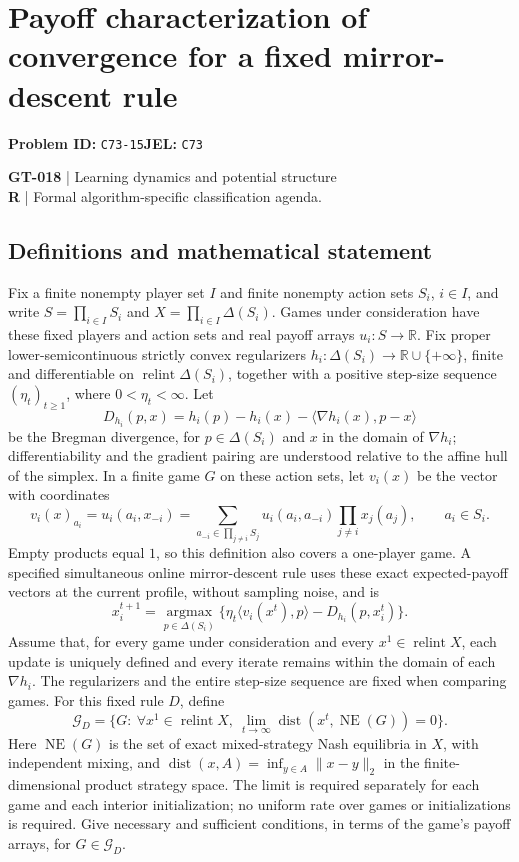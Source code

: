 \documentclass[11pt,a4paper]{article}
\newcommand{\R}{\mathbb R}
\begin{document}
\section*{Payoff characterization of convergence for a fixed mirror-descent rule}
\textbf{Problem ID:} \texttt{C73-15}\quad \textbf{JEL:} \texttt{C73}\par
\label{problem:OP-0148}
\label{game:GT-018}
{\sffamily\small\color{muted}
\textbf{GT-018} | Learning dynamics and potential structure\\
\textbf{R} | Formal algorithm-specific classification agenda.
\par}
\subsection*{Definitions and mathematical statement}
Fix a finite nonempty player set $I$ and finite nonempty action sets $S_i$, $i\in I$, and write $S=\prod_{i\in I}S_i$ and $X=\prod_{i\in I}\Delta(S_i)$. Games under consideration have these fixed players and action sets and real payoff arrays $u_i:S\to\R$. Fix proper lower-semicontinuous strictly convex regularizers $h_i:\Delta(S_i)\to\mathbb R\cup\{+\infty\}$, finite and differentiable on $\operatorname{relint}\Delta(S_i)$, together with a positive step-size sequence $(\eta_t)_{t\geq1}$, where $0<\eta_t<\infty$. Let
\[
 D_{h_i}(p,x)=h_i(p)-h_i(x)-\langle\nabla h_i(x),p-x\rangle
\]
be the Bregman divergence, for $p\in\Delta(S_i)$ and $x$ in the domain of $\nabla h_i$; differentiability and the gradient pairing are understood relative to the affine hull of the simplex. In a finite game $G$ on these action sets, let $v_i(x)$ be the vector with coordinates
\[
 v_i(x)_{a_i}=u_i(a_i,x_{-i})
 =\sum_{a_{-i}\in\prod_{j\ne i}S_j}
 u_i(a_i,a_{-i})\prod_{j\ne i}x_j(a_j),
 \qquad a_i\in S_i.
\]
Empty products equal $1$, so this definition also covers a one-player game. A specified simultaneous online mirror-descent rule uses these exact expected-payoff vectors at the current profile, without sampling noise, and is
\[
 x_i^{t+1}=\underset{p\in\Delta(S_i)}{\operatorname{argmax}}
 \{\eta_t\langle v_i(x^t),p\rangle-D_{h_i}(p,x_i^t)\}.
\]
Assume that, for every game under consideration and every $x^1\in\operatorname{relint}X$, each update is uniquely defined and every iterate remains within the domain of each $\nabla h_i$. The regularizers and the entire step-size sequence are fixed when comparing games. For this fixed rule $D$, define
\[
 \mathcal G_D=\{G:\ \forall x^1\in\operatorname{relint}X,
 \ \lim_{t\to\infty}\operatorname{dist}(x^t,\operatorname{NE}(G))=0\}.
\]
Here $\operatorname{NE}(G)$ is the set of exact mixed-strategy Nash equilibria in $X$, with independent mixing, and $\operatorname{dist}(x,A)=\inf_{y\in A}\|x-y\|_2$ in the finite-dimensional product strategy space. The limit is required separately for each game and each interior initialization; no uniform rate over games or initializations is required. Give necessary and sufficient conditions, in terms of the game's payoff arrays, for $G\in\mathcal G_D$.
\end{document}
